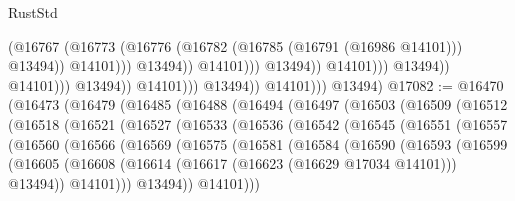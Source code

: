 \begin{lexlean}{RustStd}
\begin{coremodule}
                                                          (@16767
                                                            (@16773
                                                              (@16776
                                                                (@16782
                                                                  (@16785 (@16791 (@16986 @14101)))
                                                                  @13494))
                                                              @14101)))
                                                        @13494))
                                                    @14101)))
                                              @13494))
                                          @14101)))
                                    @13494))
                                @14101)))
                          @13494))
                      @14101)))
                @13494))
            @14101)))
      @13494)
@17082 := @16470
    (@16473
      (@16479
        (@16485
          (@16488
            (@16494
              (@16497
                (@16503
                  (@16509
                    (@16512
                      (@16518
                        (@16521
                          (@16527
                            (@16533
                              (@16536
                                (@16542
                                  (@16545
                                    (@16551
                                      (@16557
                                        (@16560
                                          (@16566
                                            (@16569
                                              (@16575
                                                (@16581
                                                  (@16584
                                                    (@16590
                                                      (@16593
                                                        (@16599
                                                          (@16605
                                                            (@16608
                                                              (@16614
                                                                (@16617
                                                                  (@16623 (@16629 @17034 @14101)))
                                                                @13494))
                                                            @14101)))
                                                      @13494))
                                                  @14101)))

\end{coremodule}
\end{lexlean}
